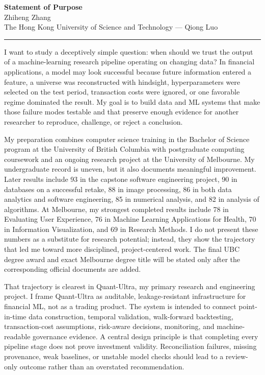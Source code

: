 \documentclass[11pt]{article}
\newcommand{\ApplicantName}{Zhiheng Zhang}
\begin{document}
\begin{center}
{\LARGE\bfseries Statement of Purpose}\\[0.25em]
{\large \ApplicantName}\\
The Hong Kong University of Science and Technology --- Qiong Luo
\end{center}
\vspace{0.35em}\hrule\vspace{0.65em}

I want to study a deceptively simple question: when should we trust the output of a machine-learning research pipeline operating on changing data? In financial applications, a model may look successful because future information entered a feature, a universe was reconstructed with hindsight, hyperparameters were selected on the test period, transaction costs were ignored, or one favorable regime dominated the result. My goal is to build data and ML systems that make those failure modes testable and that preserve enough evidence for another researcher to reproduce, challenge, or reject a conclusion.

My preparation combines computer science training in the Bachelor of Science program at the University of British Columbia with postgraduate computing coursework and an ongoing research project at the University of Melbourne. My undergraduate record is uneven, but it also documents meaningful improvement. Later results include 93 in the capstone software engineering project, 90 in databases on a successful retake, 88 in image processing, 86 in both data analytics and software engineering, 85 in numerical analysis, and 82 in analysis of algorithms. At Melbourne, my strongest completed results include 78 in Evaluating User Experience, 76 in Machine Learning Applications for Health, 70 in Information Visualization, and 69 in Research Methods. I do not present these numbers as a substitute for research potential; instead, they show the trajectory that led me toward more disciplined, project-centered work. The final UBC degree award and exact Melbourne degree title will be stated only after the corresponding official documents are added.

That trajectory is clearest in Quant-Ultra, my primary research and engineering project. I frame Quant-Ultra as auditable, leakage-resistant infrastructure for financial ML, not as a trading product. The system is intended to connect point-in-time data construction, temporal validation, walk-forward backtesting, transaction-cost assumptions, risk-aware decisions, monitoring, and machine-readable governance evidence. A central design principle is that completing every pipeline stage does not prove investment validity. Reconciliation failures, missing provenance, weak baselines, or unstable model checks should lead to a review-only outcome rather than an overstated recommendation.
\end{document}
